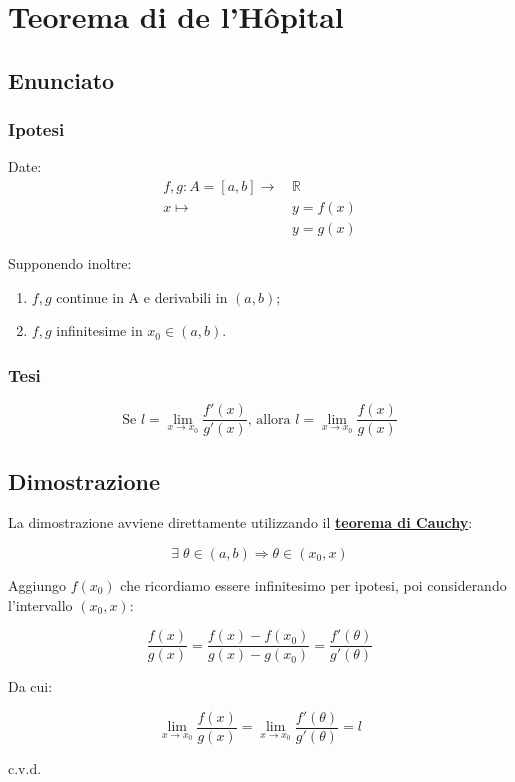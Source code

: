 \documentclass[../dimostrazioni]{subfiles}
\begin{document}
    \chapter{Teorema di de l'Hôpital}
    \label{teoHopital}

        \section*{Enunciato}

            \subsection*{Ipotesi}

                Date:
                \begin{align*}
                    f,g : A = [a, b] \longrightarrow \, &\mathbb{R}\\
                    x \longmapsto \, &y = f(x)\\
                                  &y = g(x) 
                \end{align*}

                Supponendo inoltre: 

                \begin{enumerate}
                    \indentitem \item \(f, g\) continue in A e derivabili in \( (a,b) \);
                    \indentitem \item \(f, g\) infinitesime in \(x_0 \in (a,b)\).
                \end{enumerate}

            \subsection*{Tesi}

                \[ 
                    \text{Se } l = \lim_{x \to x_0} \frac{f'(x)}{g'(x)} \text{, allora } l = \lim_{x \to x_0} \frac{f(x)}{g(x)}
                \]

        \section*{Dimostrazione}

            La dimostrazione avviene direttamente utilizzando il \textbf{\hyperref[teoCauchy]{teorema di Cauchy}}:

            \[ \exists \; \theta \in (a,b) \Rightarrow \theta \in (x_0, x) \]

            Aggiungo \(f(x_0)\) che ricordiamo essere infinitesimo per ipotesi, poi considerando l'intervallo \((x_0, x)\):

            \[  \frac{f(x)}{g(x)} = \frac{f(x) - f(x_0)}{g(x) - g(x_0)} = \frac{f'(\theta)}{g'(\theta)} \]

            Da cui:
            
            \[  \lim_{x \to x_0} \frac{f(x)}{g(x)} = \lim_{x \to x_0} \frac{f'(\theta)}{g'(\theta)} = l \]
            
            c.v.d.
\end{document}

